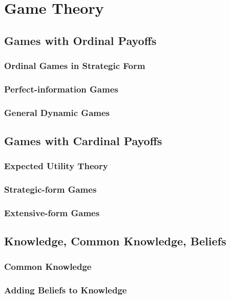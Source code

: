 \part{Game Theory}
	\chapter{Games with Ordinal Payoffs}
		\section{Ordinal Games in Strategic Form}

		\section{Perfect-information Games}

		\section{General Dynamic Games}

	\chapter{Games with Cardinal Payoffs}
		\section{Expected Utility Theory}

		\section{Strategic-form Games}

		\section{Extensive-form Games}

	\chapter{Knowledge, Common Knowledge, Beliefs}
		\section{Common Knowledge}

		\section{Adding Beliefs to Knowledge}

